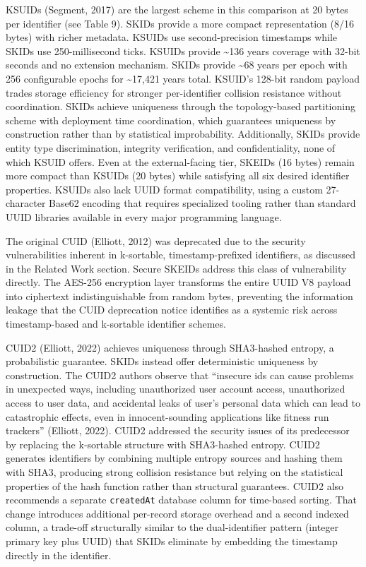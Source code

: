 \documentclass[fleqn,10pt,lineno]{wlpeerj}
\newcounter{none} %
\begin{document}
KSUIDs (Segment, 2017) are the largest scheme in this comparison at 20
bytes per identifier (see Table 9). SKIDs provide a more compact
representation (8/16 bytes) with richer metadata. KSUIDs use
second-precision timestamps while SKIDs use 250-millisecond ticks.
KSUIDs provide \textasciitilde136 years coverage with 32-bit seconds and
no extension mechanism. SKIDs provide \textasciitilde68 years per epoch
with 256 configurable epochs for \textasciitilde17,421 years total.
KSUID's 128-bit random payload trades storage efficiency for stronger
per-identifier collision resistance without coordination. SKIDs achieve
uniqueness through the topology-based partitioning scheme with
deployment time coordination, which guarantees uniqueness by
construction rather than by statistical improbability. Additionally,
SKIDs provide entity type discrimination, integrity verification, and
confidentiality, none of which KSUID offers. Even at the external-facing
tier, SKEIDs (16 bytes) remain more compact than KSUIDs (20 bytes) while
satisfying all six desired identifier properties. KSUIDs also lack UUID
format compatibility, using a custom 27-character Base62 encoding that
requires specialized tooling rather than standard UUID libraries
available in every major programming language.

The original CUID (Elliott, 2012) was deprecated due to the security
vulnerabilities inherent in k-sortable, timestamp-prefixed identifiers,
as discussed in the Related Work section. Secure SKEIDs address this
class of vulnerability directly. The AES-256 encryption layer transforms
the entire UUID V8 payload into ciphertext indistinguishable from random
bytes, preventing the information leakage that the CUID deprecation
notice identifies as a systemic risk across timestamp-based and
k-sortable identifier schemes.

CUID2 (Elliott, 2022) achieves uniqueness through SHA3-hashed entropy, a
probabilistic guarantee. SKIDs instead offer deterministic uniqueness by
construction. The CUID2 authors observe that ``insecure ids can cause
problems in unexpected ways, including unauthorized user account access,
unauthorized access to user data, and accidental leaks of user's
personal data which can lead to catastrophic effects, even in
innocent-sounding applications like fitness run trackers'' (Elliott,
2022). CUID2 addressed the security issues of its predecessor by
replacing the k-sortable structure with SHA3-hashed entropy. CUID2
generates identifiers by combining multiple entropy sources and hashing
them with SHA3, producing strong collision resistance but relying on the
statistical properties of the hash function rather than structural
guarantees. CUID2 also recommends a separate \texttt{createdAt} database
column for time-based sorting. That change introduces additional
per-record storage overhead and a second indexed column, a trade-off
structurally similar to the dual-identifier pattern (integer primary key
plus UUID) that SKIDs eliminate by embedding the timestamp directly in
the identifier.
\end{document}
